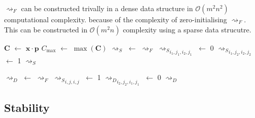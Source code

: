 $\rightsquigarrow_F$ can be constructed trivally in a dense data structure in $\mathcal{O}(m^2n^2)$ computational complexity. because of the complexity of zero-initialising $\rightsquigarrow_F$. This can be constructed in $\mathcal{O}(m^2n)$ complexity using a sparse data strucutre.

\begin{algorithm}
	\begin{algorithmic}[1]
			\State $\mathbf{C}$ $\gets$ $\mathbf{x}\cdot\mathbf{p}$
			\State $C_{\max}$ $\gets$ $\max(\mathbf{C})$
			\State $\rightsquigarrow_S$ $\gets$ $\rightsquigarrow_F$
									\State ${\rightsquigarrow_S}_{i_1,j_1,i_2,j_1}$ $\gets$ 0
								\EndIf
										\State ${\rightsquigarrow_S}_{i_1,j_2,i_2,j_2}$ $\gets$ 1
									\EndIf
								\EndFor
							\EndFor
						\EndIf
					\EndFor
				\EndIf
			\EndFor
			\State \Return $\rightsquigarrow_S$
		\EndFunction
	\end{algorithmic}
\end{algorithm}

\begin{algorithm}
	\begin{algorithmic}[1]
			\State $\rightsquigarrow_D$ $\gets$ $\rightsquigarrow_F$
				\State ${\rightsquigarrow_S}_{i,j,i,j}$ $\gets$ 1
			\EndFor
						\State ${\rightsquigarrow_D}_{i_2,j_2,i_1,j_1}$ $\gets$ 0				
					\EndFor
				\EndFor
			\EndFor
			\State \Return $\rightsquigarrow_D$
		\EndFunction
	\end{algorithmic}
\end{algorithm}


%
%
	
\subsection{Stability}

